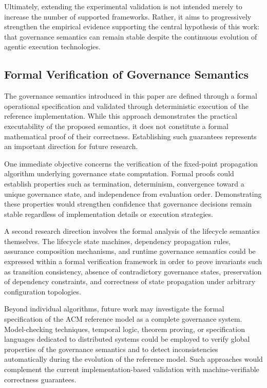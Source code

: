 \documentclass[10pt]{article}
\begin{document}
Ultimately, extending the experimental validation is not intended merely to increase the number of supported frameworks. Rather, it aims to progressively strengthen the empirical evidence supporting the central hypothesis of this work: that governance semantics can remain stable despite the continuous evolution of agentic execution technologies.

\subsection{Formal Verification of Governance Semantics}
\label{sec:future_formal_verification}

The governance semantics introduced in this paper are defined through a formal operational specification and validated through deterministic execution of the reference implementation. While this approach demonstrates the practical executability of the proposed semantics, it does not constitute a formal mathematical proof of their correctness. Establishing such guarantees represents an important direction for future research.

One immediate objective concerns the verification of the fixed-point propagation algorithm underlying governance state computation. Formal proofs could establish properties such as termination, determinism, convergence toward a unique governance state, and independence from evaluation order. Demonstrating these properties would strengthen confidence that governance decisions remain stable regardless of implementation details or execution strategies.

A second research direction involves the formal analysis of the lifecycle semantics themselves. The lifecycle state machines, dependency propagation rules, assurance composition mechanisms, and runtime governance semantics could be expressed within a formal verification framework in order to prove invariants such as transition consistency, absence of contradictory governance states, preservation of dependency constraints, and correctness of state propagation under arbitrary configuration topologies.

Beyond individual algorithms, future work may investigate the formal specification of the ACM reference model as a complete governance system. Model-checking techniques, temporal logic, theorem proving, or specification languages dedicated to distributed systems could be employed to verify global properties of the governance semantics and to detect inconsistencies automatically during the evolution of the reference model. Such approaches would complement the current implementation-based validation with machine-verifiable correctness guarantees.
\end{document}
